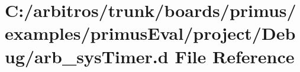 \hypertarget{boards_2primus_2examples_2primus_eval_2project_2_debug_2arb__sys_timer_8d}{\section{C\-:/arbitros/trunk/boards/primus/examples/primus\-Eval/project/\-Debug/arb\-\_\-sys\-Timer.d File Reference}
\label{boards_2primus_2examples_2primus_eval_2project_2_debug_2arb__sys_timer_8d}
}
